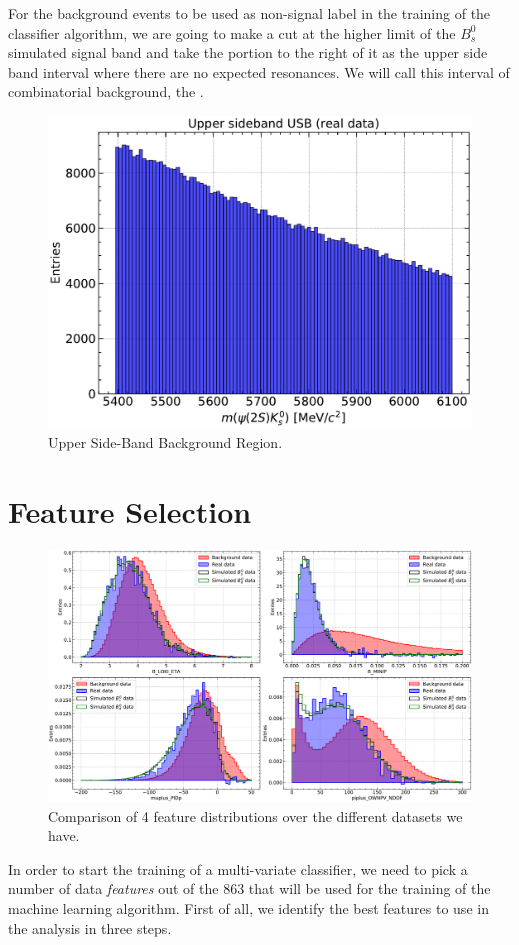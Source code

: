 For the background events to be used as non-signal label in the training of the classifier algorithm, we are going to make a cut at the higher limit of the $B_s^0$ simulated signal band and take the portion to the right of it as the upper side band interval where there are no expected resonances. We will call this interval of combinatorial background, the  .

\begin{figure}[H]
	\centering
	\includegraphics[width=0.6\linewidth]{graphs/USB.pdf}
	\caption{Upper Side-Band Background Region.}
    \label{usb}
\end{figure}


\section{Feature Selection}

\begin{figure}[H]
    \centering
    \includegraphics[width=0.8\linewidth]{graphs/features3.pdf}
    \caption{Comparison of 4 feature distributions over the different datasets we have.}
    \label{fig:fea_sel}
\end{figure}

In order to start the training of a multi-variate classifier, we need to pick a number of data \textit{features} out of the 863 that will be used for the training of the machine learning algorithm. First of all, we identify the best features to use in the analysis in three steps.

